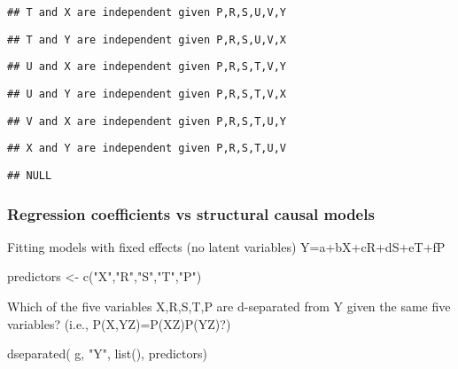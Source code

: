 \documentclass[
]{article}
\newenvironment{Shaded}{\begin{snugshade}}{\end{snugshade}}
\newcommand{\FunctionTok}[1]{\textcolor[rgb]{0.00,0.00,0.00}{#1}}
\newcommand{\NormalTok}[1]{#1}
\newcommand{\OtherTok}[1]{\textcolor[rgb]{0.56,0.35,0.01}{#1}}
\newcommand{\StringTok}[1]{\textcolor[rgb]{0.31,0.60,0.02}{#1}}
\begin{document}
\begin{verbatim}
## T and X are independent given P,R,S,U,V,Y
\end{verbatim}

\begin{verbatim}
## T and Y are independent given P,R,S,U,V,X
\end{verbatim}

\begin{verbatim}
## U and X are independent given P,R,S,T,V,Y
\end{verbatim}

\begin{verbatim}
## U and Y are independent given P,R,S,T,V,X
\end{verbatim}

\begin{verbatim}
## V and X are independent given P,R,S,T,U,Y
\end{verbatim}

\begin{verbatim}
## X and Y are independent given P,R,S,T,U,V
\end{verbatim}

\begin{verbatim}
## NULL
\end{verbatim}

\hypertarget{regression-coefficients-vs-structural-causal-models}{%
\subsubsection{Regression coefficients vs structural causal
models}\label{regression-coefficients-vs-structural-causal-models}}

Fitting models with fixed effects (no latent variables)
Y=a+bX+cR+dS+eT+fP

\begin{Shaded}
\begin{Highlighting}[]
\NormalTok{predictors }\OtherTok{\textless{}{-}} \FunctionTok{c}\NormalTok{(}\StringTok{"X"}\NormalTok{,}\StringTok{"R"}\NormalTok{,}\StringTok{"S"}\NormalTok{,}\StringTok{"T"}\NormalTok{,}\StringTok{"P"}\NormalTok{)}
\end{Highlighting}
\end{Shaded}

Which of the five variables X,R,S,T,P are d-separated from Y given the
same five variables? (i.e.,
P(X,Y\textbar Z)=P(X\textbar Z)P(Y\textbar Z)?)

\begin{Shaded}
\begin{Highlighting}[]
\FunctionTok{dseparated}\NormalTok{( g, }\StringTok{"Y"}\NormalTok{, }\FunctionTok{list}\NormalTok{(), predictors)}
\end{Highlighting}
\end{Shaded}
\end{document}
